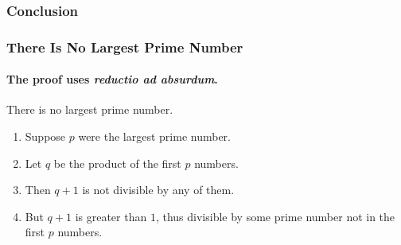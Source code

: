 \documentclass{beamer}
\begin{document}
\begin{frame}
	\frametitle{Conclusion}
\end{frame}


\begin{frame} 
	\frametitle{There Is No Largest Prime Number}
	\framesubtitle{The proof uses \textit{reductio ad absurdum}.} 
	\begin{theorem}
		There is no largest prime number. 
	\end{theorem} 
	\begin{enumerate} 
		\item<1-| alert@1> Suppose $p$ were the largest prime number. 
		\item<2-> Let $q$ be the product of the first $p$ numbers. 
		\item<3-> Then $q+1$ is not divisible by any of them. 
		\item<1-> But $q + 1$ is greater than $1$, thus divisible by some prime
		number not in the first $p$ numbers.
	\end{enumerate}
\end{frame}
\end{document}
